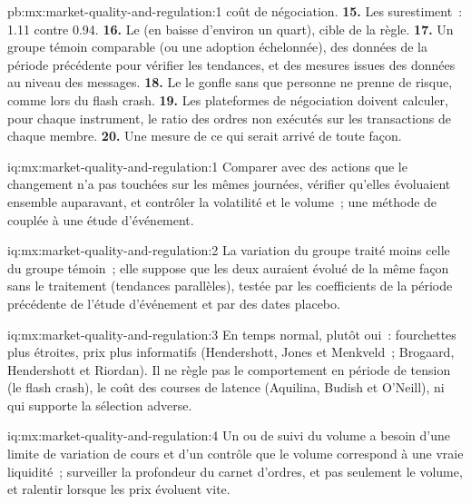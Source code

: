 \begin{solution}{pb:mx:market-quality-and-regulation:1}
coût de négociation.
\textbf{15.} Les  surestiment~: 1.11 contre 0.94.
\textbf{16.} Le  (en baisse d'environ un quart), cible de la règle.
\textbf{17.} Un groupe témoin comparable (ou une adoption échelonnée), des données de la période précédente pour vérifier les tendances, et des mesures issues des données au niveau des messages.
\textbf{18.} Le  le gonfle sans que personne ne prenne de risque, comme lors du flash crash.
\textbf{19.} Les plateformes de négociation doivent calculer, pour chaque instrument, le ratio des ordres non exécutés sur les transactions de chaque membre.
\textbf{20.} Une mesure de ce qui serait arrivé de toute façon.
\end{solution}

\begin{solution}{iq:mx:market-quality-and-regulation:1}
Comparer avec des actions que le changement n'a pas touchées sur les mêmes journées, vérifier qu'elles évoluaient ensemble auparavant, et contrôler la volatilité et le volume~; une méthode de
 couplée à une étude d'événement.
\end{solution}

\begin{solution}{iq:mx:market-quality-and-regulation:2}
La variation du groupe traité moins celle du groupe témoin~; elle suppose que les deux auraient évolué de la même façon sans le traitement (tendances parallèles), testée par
les coefficients de la période précédente de l'étude d'événement et par des dates placebo.
\end{solution}

\begin{solution}{iq:mx:market-quality-and-regulation:3}
En temps normal, plutôt oui~: fourchettes plus étroites, prix plus informatifs (Hendershott, Jones et Menkveld~; Brogaard, Hendershott et Riordan). Il ne
règle pas le comportement en période de tension (le flash crash), le coût des courses de latence (Aquilina, Budish et O'Neill), ni qui supporte la sélection adverse.
\end{solution}

\begin{solution}{iq:mx:market-quality-and-regulation:4}
Un  ou de suivi du volume a besoin d'une limite de variation de cours et d'un contrôle que le volume correspond à une vraie liquidité~; surveiller la profondeur du carnet d'ordres, et pas seulement le volume,
et ralentir lorsque les prix évoluent vite.
\end{solution}

